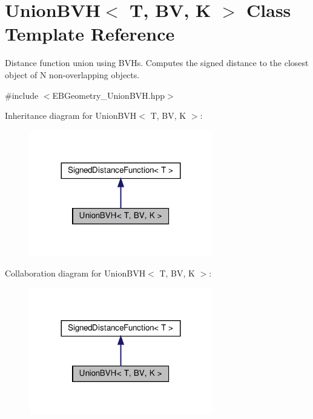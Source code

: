 \hypertarget{classUnionBVH}{}\section{Union\+B\+VH$<$ T, BV, K $>$ Class Template Reference}
\label{classUnionBVH}


Distance function union using B\+V\+Hs. Computes the signed distance to the closest object of N non-\/overlapping objects.  




{\ttfamily \#include $<$E\+B\+Geometry\+\_\+\+Union\+B\+V\+H.\+hpp$>$}



Inheritance diagram for Union\+B\+VH$<$ T, BV, K $>$\+:\nopagebreak
\begin{figure}[H]
\begin{center}
\leavevmode
\includegraphics[width=227pt]{classUnionBVH__inherit__graph}
\end{center}
\end{figure}


Collaboration diagram for Union\+B\+VH$<$ T, BV, K $>$\+:\nopagebreak
\begin{figure}[H]
\begin{center}
\leavevmode
\includegraphics[width=227pt]{classUnionBVH__coll__graph}
\end{center}
\end{figure}
